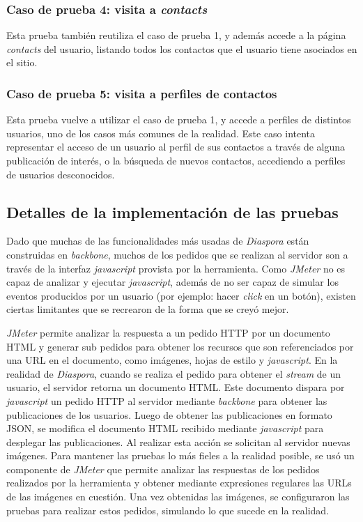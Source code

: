 \subsubsection{Caso de prueba 4: visita a \emph{contacts}}

Esta prueba también reutiliza el caso de prueba 1, y además accede a la página \emph{contacts} del usuario, listando todos los contactos que el usuario tiene asociados
en el sitio.

\subsubsection{Caso de prueba 5: visita a perfiles de contactos}

Esta prueba vuelve a utilizar el caso de prueba 1, y accede a perfiles de distintos usuarios, uno de los casos más comunes de la realidad. Este caso intenta representar
el acceso de un usuario al perfil de sus contactos a través de alguna publicación de interés, o la búsqueda de nuevos contactos, accediendo a perfiles de usuarios desconocidos.

\subsection{Detalles de la implementación de las pruebas}

Dado que muchas de las funcionalidades más usadas de \emph{Diaspora} están construidas en \emph{backbone}, muchos de los pedidos que se realizan al servidor son a través
de la interfaz \emph{javascript} provista por la herramienta. Como \emph{JMeter} no es capaz de analizar y ejecutar \emph{javascript}, además de no ser capaz de simular los 
eventos producidos por un usuario (por ejemplo: hacer \emph{click} en un botón), existen ciertas limitantes que se recrearon de la forma que se creyó mejor.

\emph{JMeter} permite analizar la respuesta a un pedido HTTP por un documento HTML y generar sub pedidos para obtener los recursos que son referenciados por una URL en
el documento, como imágenes, hojas de estilo y \emph{javascript}. En la realidad de \emph{Diaspora}, cuando se realiza el pedido para obtener el \emph{stream} de un usuario,
el servidor retorna un documento HTML. Este documento dispara por \emph{javascript} un pedido HTTP al servidor mediante \emph{backbone} para obtener las publicaciones
de los usuarios. Luego de obtener las publicaciones en formato JSON, se modifica el documento HTML recibido mediante \emph{javascript} para desplegar las publicaciones. Al
realizar esta acción se solicitan al servidor nuevas imágenes. Para mantener las pruebas lo más fieles a la realidad posible, se usó un componente de \emph{JMeter} que permite
analizar las respuestas de los pedidos realizados por la herramienta y obtener mediante expresiones regulares las URLs de las imágenes en cuestión. Una vez obtenidas las
imágenes, se configuraron las pruebas para realizar estos pedidos, simulando lo que sucede en la realidad.

